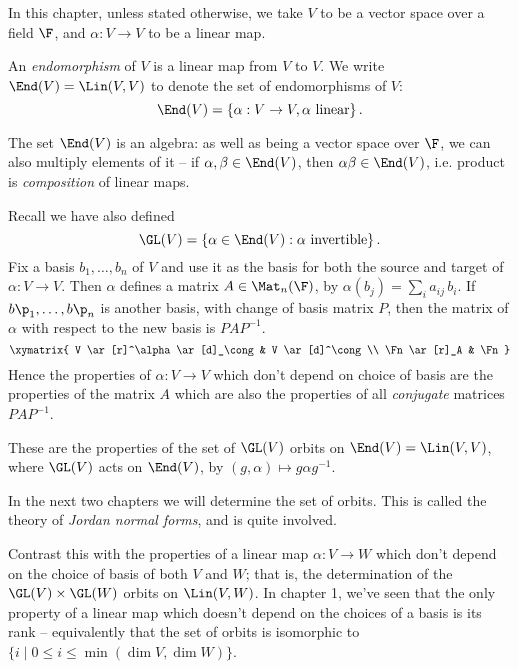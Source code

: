 \setcounter{lecture}{2}

In this chapter, unless stated otherwise, we take $V$ to be a vector space over a field $\F$, and $\alpha:V\to V$ to be a linear map.

\begin{definition}
	An \emph{endomorphism} of $V$ is a linear map from $V$ to $V$. We write $\End(V) = \Lin(V,V)$ to denote the set of endomorphisms of $V$: %
	\begin{equation*}
		\End(V) = \left\{\alpha:V\to V,\alpha \text{ linear}\right\}.
	\end{equation*}
\end{definition}

The set $\End(V)$ is an algebra: as well as being  a vector space over $\F$, we can also multiply elements of it -- if  $\alpha, \beta\in\End(V)$, then $\alpha \beta \in \End(V)$, i.e.{} product is \emph{composition} of linear maps.

Recall we have also defined
\begin{equation*}
	\GL(V) = \left\{\alpha\in\End(V):\alpha \text{ invertible}\right\}.
\end{equation*}
Fix a basis $b_1,\ldots,b_n$ of $V$ and use it as the basis for both the source and target of $\alpha:V\to V$. Then $\alpha$ defines a matrix $A\in\Mat_n(\F)$,  by $\alpha(b_j) = \sum_i a_{ij} \,b_i$. If $b\p_1,\ldots,b\p_n$ is another basis, with change of basis matrix $P$, then the matrix of $\alpha$ with respect to the new basis is $PAP^{-1}$.
\begin{equation*}
	\xymatrix{
		V
			\ar[r]^\alpha
			\ar[d]_\cong
		&
		V
			\ar[d]^\cong
		\\
		\Fn
			\ar[r]_A
		&
		\Fn
	}
\end{equation*}
Hence the properties of $\alpha:V\to V$ which don't depend on choice of basis are  the properties of the matrix $A$ which are also the properties of all \emph{conjugate} matrices $PAP^{-1}$.

These are the properties of the set of $\GL(V)$ orbits on $\End(V)=\Lin(V,V)$, where $\GL(V)$ acts on $ \End(V)$, by  $(g,\alpha)\mapsto g\alpha g^{-1}$.

In the next two chapters we will determine the set of orbits. This is called the theory of \emph{Jordan normal forms}, and is quite involved. 

Contrast this with the properties of a linear map $\alpha : V \to W$ which don't depend on the choice of basis of both $V$ and $W$; that is, the determination of the $\GL(V)\times \GL(W)$ orbits on $\Lin(V,W)$. In chapter 1, we've seen that the only property of a linear map which doesn't depend on the choices of a basis is its rank -- equivalently that the set of orbits is isomorphic to $\{i \mid 0\leq i\leq \min(\dim V,\dim W)\}$.

